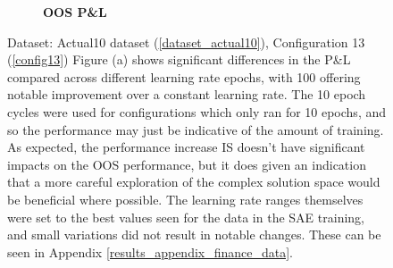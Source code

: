 \documentclass[a4paper,11pt,oneside]{article}
\theoremstyle{plain}
\theoremstyle{definition}
\begin{document}
\begin{figure}[H]
\begin{subfigure}{.5\textwidth}
			\caption{\textbf{OOS P\&L} 
				\newline }
			\label{figure-actual_oos_pl_lr_epochs}
		\end{subfigure}
		\caption[Effects of Epoch Cycle Lengths on P\&L]
		{Dataset: Actual10 dataset (\ref{dataset_actual10}), Configuration 13 (\ref{config13})
		\newline Figure (a) shows significant differences in the P\&L compared across different learning rate epochs, with 100 offering notable improvement over  a constant learning rate. The 10 epoch cycles were used for configurations which only ran for 10 epochs, and so the performance may just be indicative of the amount of training. As expected, the performance increase IS doesn't have significant impacts on the OOS performance, but it does given an indication that a more careful exploration of the complex solution space would be beneficial where possible.
		\newline\newline
		The learning rate ranges themselves were set to the best values seen for the data in the SAE training, and small variations did not result in notable changes. These can be seen in Appendix \ref{results_appendix_finance_data}.}
		\label{figure-actual_pl_lr_epochs}
	\end{figure}
	
\end{document}
